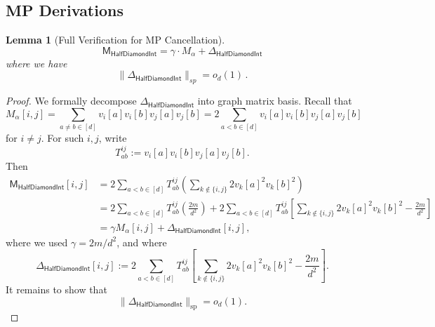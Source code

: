 \documentclass[12pt]{article}
\def \al {\alpha}
\newtheorem{lemma}[theorem]{Lemma}
\newcommand{\gam}{\gamma}
\newcommand{\cm}{\mathsf{M} }
\begin{document}
\subsection{MP Derivations}\label{sec:MP-def-proof}

\begin{lemma}[Full Verification for MP Cancellation]
	\[\cm_{\mathsf{HalfDiamondInt}} =\gam \cdot M_\al + \Delta_{\mathsf{HalfDiamondInt}} \]
where we have \[\|\Delta_{\mathsf{HalfDiamondInt}}\|_{sp} =o_d(1)\,.\]
\end{lemma}

\begin{proof}
	We formally decompose $\Delta_{\mathsf{HalfDiamondInt}} $ into graph matrix basis. Recall that
\[
    M_\alpha[i,j]
    =
    \sum_{a\neq b\in[d]}
    v_i[a]v_i[b]v_j[a]v_j[b]
    =
    2\sum_{a<b\in[d]}v_i[a]v_i[b]v_j[a]v_j[b]
\]
for \(i\neq j\). For such \(i,j\), write
\[
    T_{ab}^{ij}
    :=
    v_i[a]v_i[b]v_j[a]v_j[b].
\]
Then
\[
\begin{aligned}
    \cm_{\mathsf{HalfDiamondInt}}[i,j]
    &=
    2\sum_{a<b\in[d]} T_{ab}^{ij}
    \left(
        \sum_{k\notin\{i,j\}}2v_k[a]^2v_k[b]^2
    \right)                                                     \\
    &=
    2\sum_{a<b\in[d]} T_{ab}^{ij}
    \left(
        \frac{2m}{d^2}
    \right)
    +
    2\sum_{a<b\in[d]} T_{ab}^{ij}
    \left[
        \sum_{k\notin\{i,j\}}2v_k[a]^2v_k[b]^2
        -
        \frac{2m}{d^2}
    \right]                                                     \\
    &=
    \gamma M_\alpha[i,j]
    +
    \Delta_{\mathsf{HalfDiamondInt}}[i,j],
\end{aligned}
\]
where we used \(\gamma=2m/d^2\), and where
\[
    \Delta_{\mathsf{HalfDiamondInt}}[i,j]
    :=
    2\sum_{a<b\in[d]} T_{ab}^{ij}
    \left[
        \sum_{k\notin\{i,j\}}2v_k[a]^2v_k[b]^2
        -
        \frac{2m}{d^2}
    \right].
\]
It remains to show that
\[
    \|\Delta_{\mathsf{HalfDiamondInt}}\|_{\mathrm{sp}}
    =
    o_d(1).
\]


\end{proof}
\end{document}
